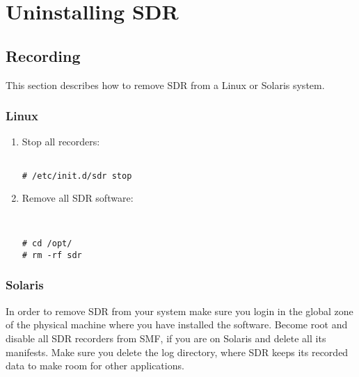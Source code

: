 \pagebreak
\section{Uninstalling SDR}

\subsection*{Recording}
\noindent
This section describes how to remove SDR from a Linux or
Solaris system.

\subsubsection*{Linux}

\begin{enumerate}

\item Stop all recorders:
\begin{Verbatim}[fontsize=\relsize{-2},frame=single,
                 label=\fbox{Stop all recorders},
                 framesep=3mm,labelposition=bottomline]

# /etc/init.d/sdr stop

\end{Verbatim}


\item Remove all SDR software:
\begin{Verbatim}[fontsize=\relsize{-2},frame=single,
                 label=\fbox{Removal of SDR},
                 framesep=3mm,labelposition=bottomline]


# cd /opt/
# rm -rf sdr

\end{Verbatim}
\end{enumerate}



\subsubsection*{Solaris}
In order to remove SDR from your system make sure you login in the 
global zone of the physical machine where you have installed the software. 
Become root and disable all SDR recorders from SMF, if you are on Solaris 
and delete all its manifests.  Make sure you delete the log directory, 
where SDR keeps its recorded data to make room for other applications.


